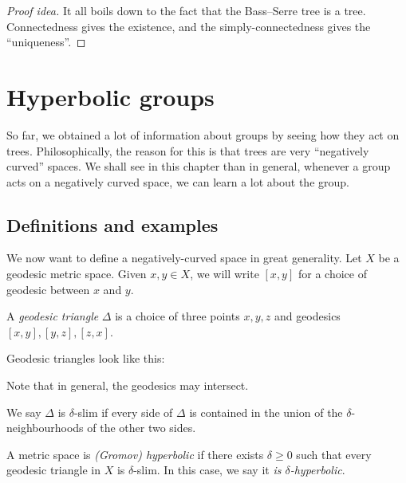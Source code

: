\documentclass[a4paper]{article}
\begin{document}
\begin{proof}[Proof idea]
  It all boils down to the fact that the Bass--Serre tree is a tree. Connectedness gives the existence, and the simply-connectedness gives the ``uniqueness''.
\end{proof}

\section{Hyperbolic groups}
So far, we obtained a lot of information about groups by seeing how they act on trees. Philosophically, the reason for this is that trees are very ``negatively curved'' spaces. We shall see in this chapter than in general, whenever a group acts on a negatively curved space, we can learn a lot about the group.

\subsection{Definitions and examples}
We now want to define a negatively-curved space in great generality. Let $X$ be a geodesic metric space. Given $x, y \in X$, we will write $[x, y]$ for a choice of geodesic between $x$ and $y$.

\begin{defi}
  A \emph{geodesic triangle} $\Delta$ is a choice of three points $x, y, z$ and geodesics $[x, y], [y, z], [z, x]$.
\end{defi}
Geodesic triangles look like this:
\begin{center}
\end{center}
Note that in general, the geodesics may intersect.

\begin{defi}
  We say $\Delta$ is $\delta$-slim if every side of $\Delta$ is contained in the union of the $\delta$-neighbourhoods of the other two sides.
\end{defi}

\begin{defi}
  A metric space is \emph{(Gromov) hyperbolic} if there exists $\delta \geq 0$ such that every geodesic triangle in $X$ is $\delta$-slim. In this case, we say it \emph{is $\delta$-hyperbolic}.
\end{defi}
\end{document}
